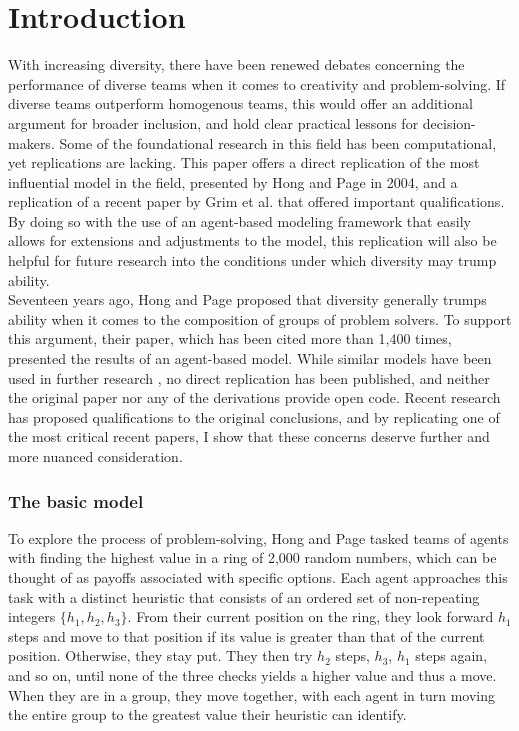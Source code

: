 
\section{Introduction}

With increasing diversity, there have been renewed debates concerning the performance of diverse teams when it comes to creativity and problem-solving. If diverse teams outperform homogenous teams, this would offer an additional argument for broader inclusion, and hold clear practical lessons for decision-makers. Some of the foundational research in this field has been computational, yet replications are lacking. This paper offers a direct replication of the most influential model in the field, presented by Hong and Page in 2004\supercite{hong_groups_2004}, and a replication of a recent paper by Grim et al.\supercite{grim_diversity_2019} that offered important qualifications. By doing so with the use of an agent-based modeling framework that easily allows for extensions and adjustments to the model, this replication will also be helpful for future research into the conditions under which diversity may trump ability. \\

Seventeen years ago, Hong and Page\supercite{hong_groups_2004} proposed that diversity generally trumps ability when it comes to the composition of groups of problem solvers. To support this argument, their paper, which has been cited more than 1,400 times, presented the results of an agent-based model. While similar models have been used in further research \supercite{singer2019diversity, grim_diversity_2019, holman2018diversity}, no direct replication has been published, and neither the original paper nor any of the derivations provide open code. Recent research has proposed qualifications to the original conclusions, and by replicating one of the most critical recent papers\supercite{grim_diversity_2019}, I show that these concerns deserve further and more nuanced consideration.  

\subsubsection{The basic model}

To explore the process of problem-solving, Hong and Page tasked teams of agents with finding the highest value in a ring of 2,000 random numbers, which can be thought of as payoffs associated with specific options. Each agent approaches this task with a distinct heuristic that consists of an ordered set of non-repeating integers $\{h_{1}, h_{2}, h_{3}\}$. From their current position on the ring, they look forward $h_{1}$ steps and move to that position if its value is greater than that of the current position. Otherwise, they stay put. They then try $h_{2}$ steps, $h_{3}$, $h_{1}$ steps again, and so on, until none of the three checks yields a higher value and thus a move. When they are in a group, they move together, with each agent in turn moving the entire group to the greatest value their heuristic can identify. \\

